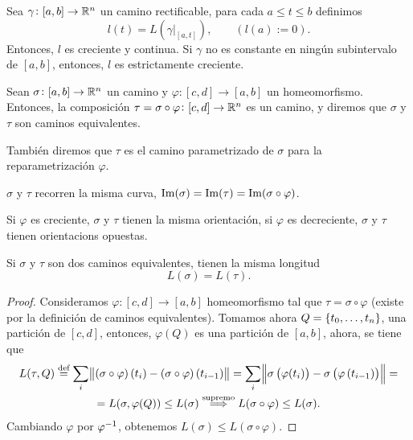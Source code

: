 \begin{prop}
    Sea $\gamma \colon [a,b] \to \mathbb{R}^n$ un camino rectificable, para cada $a \leq t \leq b$ definimos
    \[
        l(t) = L\left( \gamma\vert_{[a,t]} \right), \qquad (l(a) := 0).
    \]
    Entonces, $l$ es creciente y continua. Si $\gamma$ no es constante en ningún subintervalo de $[a,b]$,
    entonces, $l$ es estrictamente creciente.
\end{prop}

\begin{defi}
    Sean $\sigma \colon [a, b] \to \mathbb{R}^n$ un camino y $\varphi \colon [c, d] \to [a, b]$ un homeomorfismo. Entonces,
    la composición $\tau = \sigma \circ \varphi \colon [c,d] \to \mathbb{R}^n$ es un camino, y diremos que $\sigma$ y $\tau$
    son caminos equivalentes.

    Tambi\'en diremos que $\tau$ es el camino parametrizado de $\sigma$ para la reparametrización $\varphi$.
\end{defi}

\begin{obs*}
    $\sigma$ y $\tau$ recorren la misma curva, $\operatorname{Im}(\sigma) = \operatorname{Im}(\tau) = \operatorname{Im}(\sigma \circ \varphi)$.
\end{obs*}

\begin{obs}
    Si $\varphi$ es creciente, $\sigma$ y $\tau$ tienen la misma orientación, si $\varphi$ es decreciente,
    $\sigma$ y $\tau$ tienen orientacions opuestas.
\end{obs}

\begin{prop}
    Si $\sigma$ y $\tau$ son dos caminos equivalentes, tienen la misma longitud
    \[
        L(\sigma) = L(\tau).
    \]
\end{prop}

\begin{proof}
    Consideramos $\varphi \colon [c, d] \to [a, b]$ homeomorfismo tal que $\tau = \sigma \circ \varphi$
    (existe por la definición de caminos equivalentes). Tomamos ahora $Q = \left\{t_0, \dots, t_n\right\}$, una partición de $[c, d]$,
    entonces, $\varphi(Q)$ es una partición de $[a,b]$, ahora, se tiene que
    \begin{gather*}
        L(\tau, Q) \stackrel{\text{def}}{=} \sum_i \norm{(\sigma \circ \varphi) \left( t_i \right) - (\sigma \circ \varphi)\left( t_{i-1} \right)}
        = \sum_i \norm{\sigma\left( \varphi(t_i) \right) - \sigma\left( \varphi\left( t_{i-1} \right) \right)} = \\ =
        L(\sigma, \varphi(Q)) \leq L(\sigma) \stackrel{\text{supremo}}{\implies} L(\sigma \circ \varphi) \leq L(\sigma).
    \end{gather*}
    Cambiando $\varphi$ por $\varphi^{-1}$, obtenemos $L(\sigma) \leq L(\sigma \circ \varphi)$.
\end{proof}

